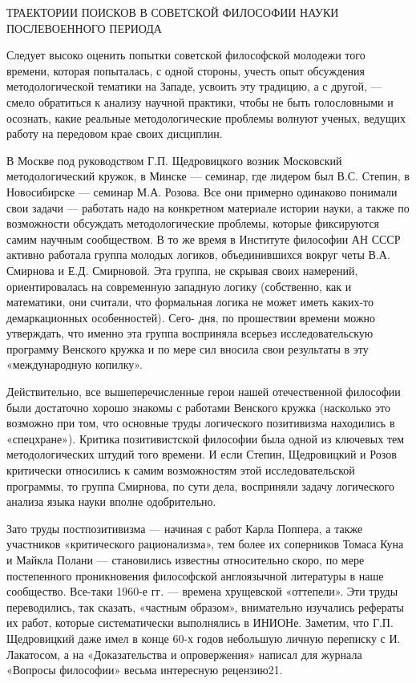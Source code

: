 \documentclass[11pt,a4paper]{article}
\begin{document}
ТРАЕКТОРИИ ПОИСКОВ В СОВЕТСКОЙ ФИЛОСОФИИ НАУКИ ПОСЛЕВОЕННОГО ПЕРИОДА

Следует высоко оценить попытки советской философской молодежи того времени,
которая попыталась, с одной стороны, учесть опыт обсуждения методологической
тематики на Западе, усвоить эту традицию, а с другой, — смело обратиться к
анализу научной практики, чтобы не быть голословными и осознать, какие
реальные методологические проблемы волнуют ученых, ведущих работу на передовом
крае своих дисциплин.

В Москве под руководством Г.П. Щедровицкого возник Московский методологический
кружок, в Минске — семинар, где лидером был В.С. Степин, в Новосибирске —
семинар М.А. Розова. Все они примерно одинаково понимали свои задачи —
работать надо на конкретном материале истории науки, а также по возможности
обсуждать методологические проблемы, которые фиксируются самим научным
сообществом. В то же время в Институте философии АН СССР активно работала
группа молодых логиков, объединившихся вокруг четы В.А. Смирнова и
Е.Д. Смирновой. Эта группа, не скрывая своих намерений, ориентировалась на
современную западную логику (собственно, как и математики, они считали, что
формальная логика не может иметь каких-то демаркационных особенностей). Сего-
дня, по прошествии времени можно утверждать, что именно эта группа восприняла
всерьез исследовательскую программу Венского кружка и по мере сил вносила
свои результаты в эту «международную копилку».

Действительно, все вышеперечисленные герои нашей отечественной философии
были достаточно хорошо знакомы с работами Венского кружка (насколько это
возможно при том, что основные труды логического позитивизма находились в
«спецхране»). Критика позитивистской философии была одной из ключевых тем
методологических штудий того времени. И если Степин, Щедровицкий и Розов
критически относились к самим возможностям этой исследовательской программы,
то группа Смирнова, по сути дела, восприняли задачу логического анализа
языка науки вполне одобрительно.

Зато труды постпозитивизма — начиная с работ Карла Поппера, а также
участников «критического рационализма», тем более их соперников Томаса Куна
и Майкла Полани — становились известны относительно скоро, по мере
постепенного проникновения философской англоязычной литературы в наше
сообщество. Все-таки 1960-е гг. — времена хрущевской «оттепели». Эти труды
переводились, так сказать, «частным образом», внимательно изучались рефераты
их работ, которые систематически выполнялись в ИНИОНе. Заметим, что
Г.П. Щедровицкий даже имел в конце 60-х годов небольшую личную переписку с
И. Лакатосом, а на «Доказательства и опровержения» написал для журнала
«Вопросы философии» весьма интересную рецензию21.
\end{document}
